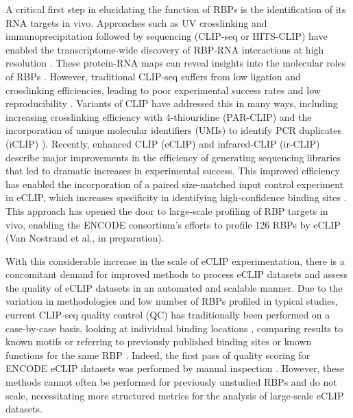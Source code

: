 A critical first step in elucidating the function of RBPs is the identification of its RNA targets in vivo. Approaches such as UV crosslinking and immunoprecipitation followed by sequencing (CLIP-seq or HITS-CLIP) have enabled the transcriptome-wide discovery of RBP-RNA interactions at high resolution \cite{WAGENMAKERS1980,Greenberg1979,Ule2003}. These protein-RNA maps can reveal insights into the molecular roles of RBPs \cite{Yeo2009,Ule2003}. However, traditional CLIP-seq suffers from low ligation and crosslinking efficiencies, leading to poor experimental success rates and low reproducibility \cite{VanNostrand2016}. Variants of CLIP have addressed this in many ways, including increasing crosslinking efficiency with 4-thiouridine (PAR-CLIP) \cite{Hafner2010} and the incorporation of unique molecular identifiers (UMIs) to identify PCR duplicates (iCLIP) \cite{Konig2010}). Recently, enhanced CLIP (eCLIP) \cite{VanNostrand2016} and infrared-CLIP (ir-CLIP)\cite{Zarnegar2016} describe major improvements in the efficiency of generating sequencing libraries that led to dramatic increases in experimental success. This improved efficiency has enabled the incorporation of a paired size-matched input control experiment in eCLIP, which increases specificity in identifying high-confidence binding sites \cite{VanNostrand2016}. This approach has opened the door to large-scale profiling of RBP targets in vivo, enabling the ENCODE consortium’s efforts to profile 126 RBPs by eCLIP (Van Nostrand et al., in preparation).

With this considerable increase in the scale of eCLIP experimentation, there is a concomitant demand for improved methods to process eCLIP datasets and assess the quality of eCLIP datasets in an automated and scalable manner. Due to the variation in methodologies and low number of RBPs profiled in typical studies, current CLIP-seq quality control (QC) has traditionally been performed on a case-by-case basis, looking at individual binding locations \cite{Konig2010, Ule2003}, comparing results to known motifs \cite{Ray2013,Cook2011} or referring to previously published binding sites or known functions for the same RBP \cite{Weyn-Vanhentenryck2014,Zarnack2013}. Indeed, the first pass of quality scoring for ENCODE eCLIP datasets was performed by manual inspection \cite{VanNostrand2016}. However, these methods cannot often be performed for previously unstudied RBPs and do not scale, necessitating more structured metrics for the analysis of large-scale eCLIP datasets.

